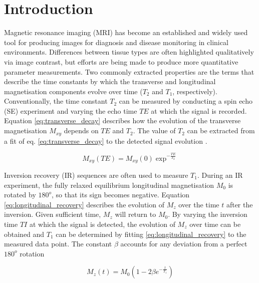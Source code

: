 \documentclass[journal]{IEEEtran}
\begin{document}



\section{Introduction}

Magnetic resonance imaging (MRI) has become an established and widely used tool for producing images for diagnosis and disease monitoring in clinical environments. Differences between tissue types are often highlighted qualitatively via image contrast, but efforts are being made to produce more quantitative parameter measurements. Two commonly extracted properties are the terms that describe the time constants by which the transverse and longitudinal magnetisation components evolve over time ($T_2$ and $T_1$, respectively). Conventionally, the time constant $T_2$ can be measured by conducting a spin echo (SE) experiment and varying the echo time $TE$ at which the signal is recorded. Equation \ref{eq:transverse_decay} describes how the evolution of the transverse magnetisation $M_{xy}$ depends on $TE$ and $T_2$. The value of $T_2$ can be extracted from a fit of eq. \ref{eq:transverse_decay} to the detected signal evolution \cite{haackemagnetic}. 

\begin{equation} \label{eq:transverse_decay}
M_{xy} (TE) = M_{xy}(0)\exp^{-\frac{TE}{T_{2}}}
\end{equation}

Inversion recovery (IR) sequences are often used to measure $T_1$. During an IR experiment, the fully relaxed equilibrium longitudinal magnetisation $M_{0}$ is rotated by $180^{o}$, so that its sign becomes negative. Equation \eqref{eq:longitudinal_recovery} describes the evolution of $M_{z}$ over the time $t$ after the inversion. Given sufficient time, $M_{z}$ will return to $M_{0}$. By varying the inversion time $TI$ at which the signal is detected, the evolution of $M_{z}$ over time can be obtained and $T_1$ can be determined by fitting  \eqref{eq:longitudinal_recovery} to the measured data point. The constant $\beta$ accounts for any deviation from a perfect $180^{o}$ rotation

\begin{equation} \label{eq:longitudinal_recovery}
M_{z} (t) = M_{0}(1 - 2\beta e^{-\frac{t}{T_1}} )
\end{equation}
\end{document}
